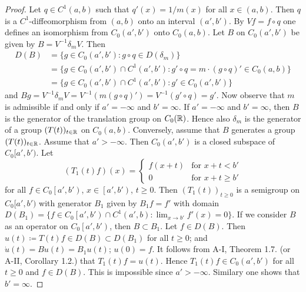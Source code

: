 \begin{proof}
Let $q \in C^{1}(a,b)$ such that $q'(x) = 1/m(x)$ for all $x \in (a,b)$.
Then $q$ is a $C^{1}$-diffeomorphism from $(a,b)$ onto an interval $(a',b')$.
By $Vf = f \circ q$ one defines an isomorphism from $C_{0}(a',b')$ onto $C_{0}(a,b)$.
Let $B$ on $C_{0}(a',b')$ be given by $B = V^{-1}\delta_{m}V$.
Then 
\begin{align*}
D(B) &= \{ g \in C_{0}(a',b') \colon g \circ q \in D(\delta_{m}) \} \\
&= \{ g \in C_{0}(a',b') \cap C^{1}(a',b') \colon g' \circ q 
= m \cdot (g \circ q)' \in C_{0}(a,b) \} \\
&= \{ g \in C_{0}(a',b') \cap C^{1}(a',b') \colon g' \in C_{0}(a',b') \}
\end{align*}
and $Bg = V^{-1}\delta_{m}V = V^{-1}(m(g \circ q)') = V^{-1}(g' \circ q) = g'$.
Now observe that $m$ is admissible if and only if $a' = -\infty$ and $b' = \infty$.
If $a' = -\infty$ and $b' = \infty$, then $B$ is the generator of the translation group on $C_{0}(\mathbb{R})$.
Hence also $\delta_{m}$ is the generator of a group $(T(t))_{t \in \mathbb{R}}$ on $C_{0}(a,b)$.
Conversely, assume that $B$ generates a group $(T(t))_{t \in \mathbb{R}}$.
Assume that $a' > -\infty$.
Then $C_{0}(a',b')$ is a closed subspace of $C_{0}[a',b')$.
Let
\begin{equation*}\label{eq:b2-t1}
(T_{1}(t)f)(x) = \begin{cases}
    f(x+t) & \text{for } x+t < b' \\
    0 & \text{for } x+t \geq b'
\end{cases}
\end{equation*}
for all $f \in C_{0}\left[a',b'\right)$, $x \in \left[a',b'\right)$, $t \geq 0$.
Then $(T_{1}(t))_{t \geq 0}$ is a semigroup on $C_{0}[a',b')$ with generator $B_{1}$ given by $B_{1}f = f'$ with domain $D(B_{1}) = \{ f \in C_{0}\left[a',b'\right) \cap C^{1}(a',b) \colon \lim_{x \to b'} f'(x) = 0 \}$.
If we consider $B$ as an operator on $C_{0}\left[a',b'\right)$, then $B \subset B_{1}$.
Let $f \in D(B)$.
Then $u(t) \coloneqq T(t)f \in D(B) \subset D(B_{1})$ for all $t \geq 0$; and $\dot{u}(t) = Bu(t) = B_{1}u(t)$; $u(0) = f$.
It follows from A-I, Theorem 1.7.  (or A-II, Corollary 1.2.)
that $T_{1}(t)f = u(t)$.
Hence $T_{1}(t)f \in C_{0}(a',b')$ for all $t \geq 0$ and $f \in D(B)$.
This is impossible since $a' > -\infty$.
Similary one shows that $b' = \infty$.
\end{proof}

